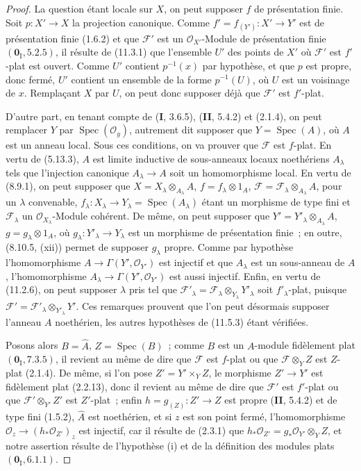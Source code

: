 \begin{proof}
La question étant locale sur $X$, on peut supposer $f$ de présentation finie.
Soit $p:X'\to X$ la projection canonique. Comme
$f'=f_{(Y')}:X'\to Y'$ est de présentation finie (1.6.2) et que $\mathcal F'$
est un $\mathcal O_{X'}$-Module de présentation finie
$(\mathbf 0_{\mathrm I},5.2.5)$, il résulte de (11.3.1) que l'ensemble $U'$ des
points de $X'$ où $\mathcal F'$ est $f'$-plat est ouvert. Comme $U'$ contient
$p^{-1}(x)$ par hypothèse, et que $p$ est propre, donc fermé, $U'$ contient un
ensemble de la forme $p^{-1}(U)$, où $U$ est un voisinage de $x$. Remplaçant $X$
par $U$, on peut donc supposer déjà que $\mathcal F'$ est $f'$-plat.

D'autre part, en tenant compte de (\textbf I, 3.6.5), (\textbf{II}, 5.4.2) et
(2.1.4), on peut remplacer $Y$ par $\operatorname{Spec}(\mathcal O_y)$,
autrement dit supposer que $Y=\operatorname{Spec}(A)$, où $A$ est un anneau
local. Sous ces conditions, on va prouver que $\mathcal F$ est $f$-plat. En
vertu de (5.13.3), $A$ est limite inductive de sous-anneaux locaux noethériens
$A_\lambda$ tels que l'injection canonique $A_\lambda\to A$ soit un
homomorphisme local. En vertu de (8.9.1), on peut supposer que
$X=X_\lambda\otimes_{A_\lambda}A$, $f=f_\lambda\otimes1_A$,
$\mathcal F=\mathcal F_\lambda\otimes_{A_\lambda}A$, pour un $\lambda$
convenable, $f_\lambda:X_\lambda\to Y_\lambda=\operatorname{Spec}(A_\lambda)$
étant un morphisme de type fini et $\mathcal F_\lambda$ un
$\mathcal O_{X_\lambda}$-Module cohérent. De même, on peut supposer que
$Y'=Y'_\lambda\otimes_{A_\lambda}A$, $g=g_\lambda\otimes1_A$, où
$g_\lambda:Y'_\lambda\to Y_\lambda$ est un morphisme de présentation finie~;
en outre, (8.10.5, (xii)) permet de supposer $g_\lambda$ propre. Comme par
hypothèse l'homomorphisme $A\to\Gamma(Y',\mathcal O_{Y'})$ est injectif et que
$A_\lambda$ est un sous-anneau de $A$, l'homomorphisme
$A_\lambda\to\Gamma(Y',\mathcal O_{Y'})$ est aussi injectif. Enfin, en vertu de
(11.2.6), on peut supposer $\lambda$ pris tel que
$\mathcal F'_\lambda=\mathcal F_\lambda\otimes_{Y_\lambda}Y'_\lambda$ soit
$f'_\lambda$-plat, puisque $\mathcal F'=\mathcal F'_\lambda\otimes_{Y'_\lambda}Y'$.
Ces remarques prouvent que l'on peut désormais supposer l'anneau $A$
noethérien, les autres hypothèses de (11.5.3) étant vérifiées.

Posons alors $B=\widehat A$, $Z=\operatorname{Spec}(B)$~; comme $B$ est un
$A$-module fidèlement plat $(\mathbf 0_{\mathrm I},7.3.5)$, il revient au même
de dire que $\mathcal F$ est $f$-plat ou que $\mathcal F\otimes_Y Z$ est
$Z$-plat (2.1.4). De même, si l'on pose $Z'=Y'\times_Y Z$, le morphisme
$Z'\to Y'$ est fidèlement plat (2.2.13), donc il revient au même de dire que
$\mathcal F'$ est $f'$-plat ou que $\mathcal F'\otimes_{Y'}Z'$ est $Z'$-plat~;
enfin $h=g_{(Z)}:Z'\to Z$ est propre (\textbf{II}, 5.4.2) et de type fini
(1.5.2), $\widehat A$ est noethérien, et si $z$ est son point
fermé,
l'homomorphisme $\mathcal O_z\to(h_*\mathcal O_{Z'})_z$ est injectif, car il
résulte de (2.3.1) que $h_*\mathcal O_{Z'}=g_*\mathcal O_{Y'}\otimes_Y Z$,
et notre assertion résulte de l'hypothèse (i) et de la définition des modules
plats $(\mathbf 0_{\mathrm I},6.1.1)$.


\end{proof}
